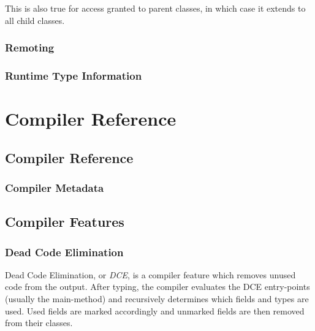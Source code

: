 \documentclass{haxe}
\begin{document}

This is also true for access granted to parent classes, in which case it extends to all child classes.



\section{Remoting}
\label{lf-remoting}

\section{Runtime Type Information}
\label{lf-rtti}

\part{Compiler Reference}

\chapter{Compiler Reference}
\label{compiler-reference}

\section{Compiler Metadata}
\label{cr-metadata}

\chapter{Compiler Features}
\label{cr-features}

\section{Dead Code Elimination}
\label{cr-dce}

Dead Code Elimination, or \emph{DCE}, is a compiler feature which removes unused code from the output. After typing, the compiler evaluates the DCE entry-points (usually the main-method) and recursively determines which fields and types are used. Used fields are marked accordingly and unmarked fields are then removed from their classes.
\end{document}
